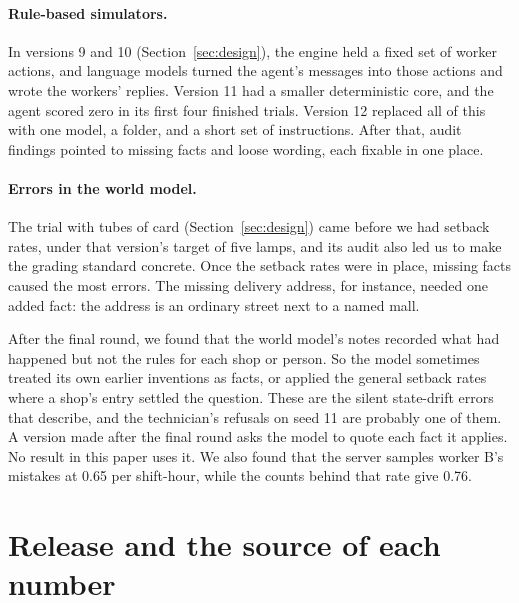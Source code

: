 \documentclass[10pt]{article}
\begin{document}
\paragraph{Rule-based simulators.} In versions 9 and 10 (Section~\ref{sec:design}), the engine held a fixed set of worker
actions, and language models turned the agent's messages into those actions and wrote the workers' replies. Version 11 had a smaller deterministic
core, and the agent scored zero in its first four finished trials. Version 12 replaced all of this with one model, a folder, and a
short set of instructions. After that, audit findings pointed to missing facts and loose wording, each fixable in one place.

\paragraph{Errors in the world model.} The trial with tubes of card (Section~\ref{sec:design}) came before we had setback rates,
under that version's target of five lamps, and its audit also led us to make the grading standard concrete. Once the setback rates were in
place, missing facts caused the most errors. The missing delivery address, for instance, needed one added fact: the address is an
ordinary street next to a named mall.

After the final round, we found that the world model's notes recorded what had happened but not the rules for each shop or person.
So the model sometimes treated its own earlier inventions as facts, or applied the general setback rates where a shop's entry
settled the question. These are the silent state-drift errors that \citet{liu2026envsimbench} describe, and the technician's
refusals on seed 11 are probably one of them. A version made after the final round asks the model to quote each fact it applies. No
result in this paper uses it. We also found that the server samples worker B's mistakes at 0.65 per shift-hour, while the counts
behind that rate give 0.76.

\section{Release and the source of each number}
\label{app:files}
\end{document}
